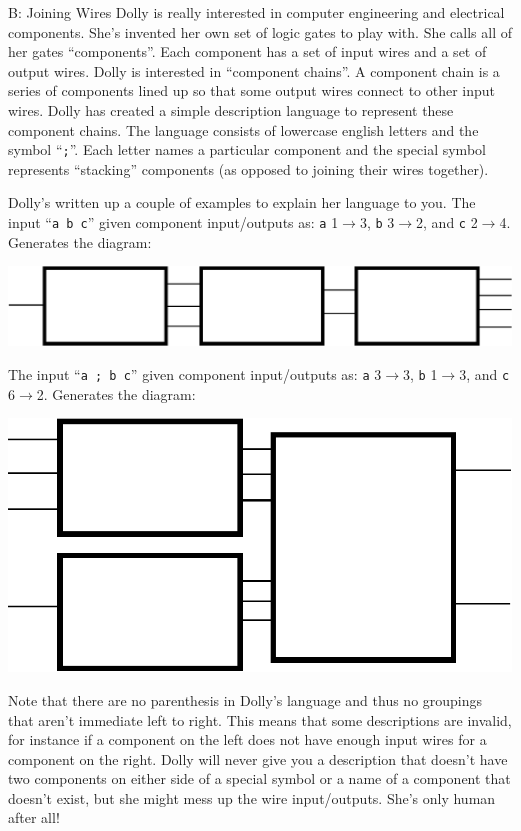 \begin{problem}{B: Joining Wires}
Dolly is really interested in computer engineering and electrical components.
She's invented her own set of logic gates to play with.
She calls all of her gates ``components''.
Each component has a set of input wires and a set of output wires.
Dolly is interested in ``component chains''.
A component chain is a series of components lined up so that some output wires connect to other input wires.
Dolly has created a simple description language to represent these component chains.
The language consists of lowercase english letters and the symbol ``\texttt{;}''.
Each letter names a particular component and the special symbol represents ``stacking'' components (as opposed to joining their wires together).

Dolly's written up a couple of examples to explain her language to you.
The input ``\texttt{a b c}'' given component input/outputs as: \texttt{a} 1$\rightarrow$3, \texttt{b} 3$\rightarrow$2, and \texttt{c} 2$\rightarrow$4.
Generates the diagram:

\includegraphics[scale=.5]{./composition/pictures/diagram1.eps}

The input ``\texttt{a ; b c}'' given component input/outputs as: \texttt{a} 3$\rightarrow$3, \texttt{b} 1$\rightarrow$3, and \texttt{c} 6$\rightarrow$2.
Generates the diagram:

\includegraphics[scale=.5]{./composition/pictures/diagram2.eps}

Note that there are no parenthesis in Dolly's language and thus no groupings that aren't immediate left to right.
This means that some descriptions are invalid, for instance if a component on the left does not have enough input wires for a component on the right.
Dolly will never give you a description that doesn't have two components on either side of a special symbol or a name of a component that doesn't exist, but she might mess up the wire input/outputs.
She's only human after all!


\end{problem}
